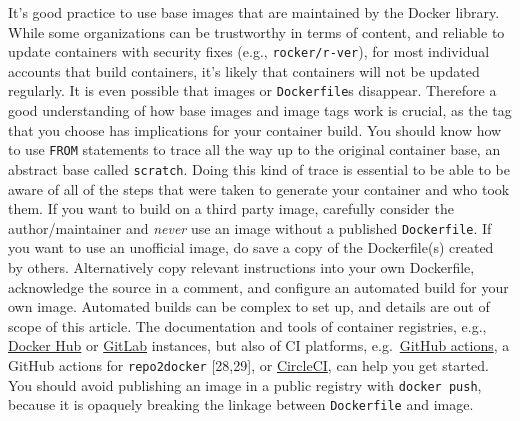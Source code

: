 \documentclass[10pt,letterpaper]{article}
\begin{document}
It's good practice to use base images that are maintained by the Docker
library. While some organizations can be trustworthy in terms of
content, and reliable to update containers with security fixes (e.g.,
\texttt{rocker/r-ver}), for most individual accounts that build
containers, it's likely that containers will not be updated regularly.
It is even possible that images or \texttt{Dockerfile}s disappear.
Therefore a good understanding of how base images and image tags work is
crucial, as the tag that you choose has implications for your container
build. You should know how to use \texttt{FROM} statements to trace all
the way up to the original container base, an abstract base called
\texttt{scratch}. Doing this kind of trace is essential to be able to be
aware of all of the steps that were taken to generate your container and
who took them. If you want to build on a third party image, carefully
consider the author/maintainer and \emph{never} use an image without a
published \texttt{Dockerfile}. If you want to use an unofficial image,
do save a copy of the Dockerfile(s) created by others. Alternatively
copy relevant instructions into your own Dockerfile, acknowledge the
source in a comment, and configure an automated build for your own
image. Automated builds can be complex to set up, and details are out of
scope of this article. The documentation and tools of container
registries, e.g.,
\href{https://docs.docker.com/docker-hub/builds/}{Docker Hub} or
\href{https://docs.gitlab.com/ee/user/packages/container_registry/index.html\#build-and-push-images}{GitLab}
instances, but also of CI platforms,
e.g.~\href{https://github.com/actions/starter-workflows/tree/master/ci}{GitHub
actions}, a GitHub actions for \texttt{repo2docker} {[}28,29{]}, or
\href{https://circleci.com/orbs/registry/orb/circleci/docker\#commands-build}{CircleCI},
can help you get started. You should avoid publishing an image in a
public registry with \texttt{docker\ push}, because it is opaquely
breaking the linkage between \texttt{Dockerfile} and image.
\end{document}

